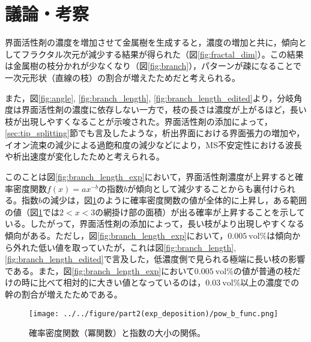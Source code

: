 \documentclass[autodetect-engine,dvi=dvipdfmx,a4paper,ja=standard,oneside,openany,11pt]{bxjsbook}
\begin{document}
\section{議論・考察}
界面活性剤の濃度を増加させて金属樹を生成すると，濃度の増加と共に，傾向としてフラクタル次元が減少する結果が得られた（図\ref{fig:fractal_dim}）。この結果は金属樹の枝分かれが少なくなり（図\ref{fig:branch}），パターンが疎になることで一次元形状（直線の枝）の割合が増えたためだと考えられる。

また，図\ref{fig:angle}, \ref{fig:branch_length}, \ref{fig:branch_length_edited}より，分岐角度は界面活性剤の濃度に依存しない一方で，枝の長さは濃度が上がるほど，長い枝が出現しやすくなることが示唆された。界面活性剤の添加によって，\ref{sec:tip_splitting}節でも言及したような，析出界面における界面張力の増加や，イオン流束の減少による過飽和度の減少などにより，MS不安定性における波長や析出速度が変化したためと考えられる。

このことは図\ref{fig:branch_length_exp}において，界面活性剤濃度が上昇すると確率密度関数$f(x)=ax^{-b}$の指数$b$が傾向として減少することからも裏付けられる。指数$b$の減少は，図\ref{fig:pow_b_func}のように確率密度関数の値が全体的に上昇し，ある範囲の値（図\ref{fig:pow_b_func}では$2<x<3$の網掛け部の面積）が出る確率が上昇することを示している。したがって，界面活性剤の添加によって，長い枝がより出現しやすくなる傾向がある。ただし，図\ref{fig:branch_length_exp}において，$\SI{0.005}{\mathrm{vol}\%}$は傾向から外れた低い値を取っていたが，これは図\ref{fig:branch_length},\ref{fig:branch_length_edited}で言及した，低濃度側で見られる極端に長い枝の影響である。また，図\ref{fig:branch_length_exp}において$\SI{0.005}{\mathrm{vol}\%}$の値が普通の枝だけの時に比べて相対的に大きい値となっているのは，$\SI{0.03}{\mathrm{vol}\%}$以上の濃度での幹の割合が増えたためである。

\begin{figure}[htbp]
  \centering
  \texttt{[image: ../../figure/part2(exp\_deposition)/pow\_b\_func.png]}
  \caption{確率密度関数（冪関数）と指数の大小の関係。}
  \label{fig:pow_b_func}
\end{figure}

\ifdraft{
  
  
}{}
\end{document}
